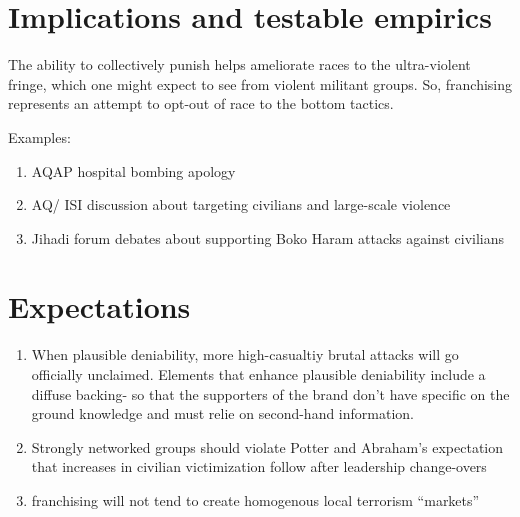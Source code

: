 \documentclass{article}
\begin{document}
\section{Implications and testable empirics}

The ability to collectively punish helps ameliorate races to the ultra-violent fringe, which one might expect to see from
violent militant groups. So, franchising represents an attempt to
opt-out of race to the bottom tactics. 

Examples:
\begin{enumerate}
 
\item AQAP hospital bombing apology
\item AQ/ ISI discussion about targeting civilians and large-scale violence     
\item Jihadi forum debates about supporting Boko Haram attacks against civilians
     
\end{enumerate}


\section{Expectations}

\begin{enumerate}

\item When plausible deniability, more high-casualtiy brutal attacks
  will go officially unclaimed.  Elements that enhance plausible
  deniability include a diffuse backing- so that the supporters of the
  brand don't have specific on the ground knowledge and must relie on
  second-hand information.
\item Strongly networked groups should violate Potter and Abraham's expectation
that increases in civilian victimization follow after leadership change-overs
\item franchising will not tend to create homogenous local terrorism ``markets'' \\

\end{enumerate}
\end{document}
